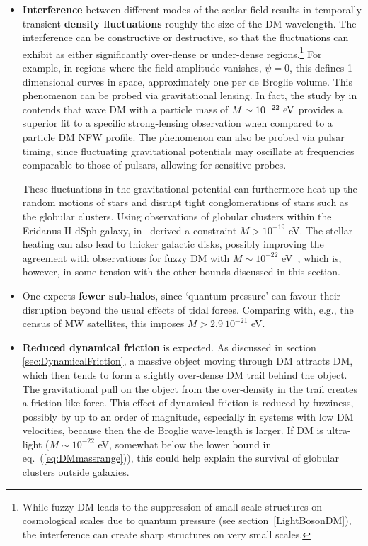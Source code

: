 \begin{itemize}
\item[$\circ$] {\bf Interference} between different modes of the scalar field results in temporally transient {\bf density fluctuations} roughly the size of the DM wavelength. The interference can be constructive or destructive, so that the fluctuations can exhibit as either significantly over-dense or under-dense regions.\footnote{While fuzzy DM leads to the suppression of small-scale structures on cosmological scales due to quantum pressure (see section~\ref{LightBosonDM}), the interference  can create sharp structures on very small scales.}
For example, in regions where the field amplitude vanishes,
$\psi=0$, this defines 1-dimensional curves in space, approximately one per de Broglie volume.
This phenomenon can be probed via gravitational lensing. 
In fact, the study by  in \cite{FuzzyDMbounds} contends that wave DM with a particle mass of  $M \sim 10^{-22}\, \,{\rm eV}$ provides a superior fit to a specific strong-lensing observation when compared to a particle DM NFW profile.
The phenomenon can also be probed via pulsar timing, since fluctuating gravitational potentials may oscillate at frequencies comparable to those of  pulsars, allowing for sensitive probes. 


These fluctuations in the gravitational potential can furthermore heat up the random motions of stars and disrupt tight conglomerations of stars such as the globular clusters. 
Using observations of 
globular clusters within the Eridanus II dSph galaxy,  in~\cite{FuzzyDMbounds} derived a constraint $M > 10^{-19}$ eV. 
The stellar heating can also lead to thicker galactic disks, possibly improving the agreement with observations for fuzzy DM with $M \sim 10^{-22}$ eV~\cite{FuzzyDMbounds}, which is, however, in some tension with the other bounds discussed in this section.

\item[$\circ$] One expects {\bf fewer sub-halos}, since `quantum pressure' can favour their disruption beyond the usual effects of tidal forces. Comparing with, e.g., the census of MW satellites, this imposes $M > 2.9~10^{-21}$ eV.


\item[$\circ$] {\bf Reduced dynamical friction}  is expected.
As discussed in section \ref{sec:DynamicalFriction}, a massive object moving through DM attracts DM, which then tends to form a slightly over-dense DM trail behind the object.
The gravitational pull on the object from the over-density in the trail creates a friction-like force.
This effect of dynamical friction is reduced  by fuzziness, possibly by up to an order of magnitude,
especially in systems with low DM velocities,
because then the de Broglie wave-length 
is larger.
If DM is ultra-light ($M \sim 10^{-22}$ eV, somewhat below the lower bound in eq.~(\ref{eq:DMmassrange})), 
this could help explain the survival of globular clusters outside galaxies. 



\end{itemize}
